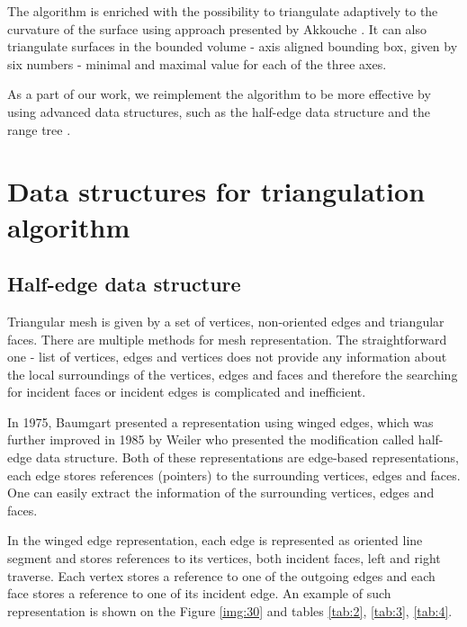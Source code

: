 The algorithm is enriched with the possibility to triangulate adaptively
to the curvature of the surface using approach presented by Akkouche 
\cite{akkouche2001adaptive}. It can also triangulate surfaces in the
bounded volume - axis aligned bounding box, given by six numbers - minimal
and maximal value for each of the three axes.

As a part of our work, we reimplement the algorithm to be more effective by
using advanced data structures, such as the half-edge data structure 
\cite{kettner1999using} and the range tree \cite{lueker1978data}. 
\section{Data structures for triangulation algorithm}
\label{sub2.5}

\subsection{Half-edge data structure}
Triangular mesh is given by a set of vertices, non-oriented edges and triangular faces.
There are multiple methods for mesh representation. The straightforward one -
list of vertices, edges and vertices does not provide any information about
the local surroundings of the vertices, edges and faces and therefore the searching
for incident faces or incident edges is complicated and inefficient.

In 1975, Baumgart \cite{baumgart1975polyhedron} presented a representation
using winged edges, which was further improved in 1985 by Weiler \cite{weiler1985edge}
who presented the modification called half-edge data structure.
Both of these representations are edge-based representations, each edge stores
references (pointers) to the surrounding vertices, edges and faces. One can easily extract the information of the
surrounding vertices, edges and faces.

In the winged edge representation, each edge is represented as oriented line segment 
and stores references to its vertices, both incident faces, left and right traverse. 
Each vertex stores a reference to one of the outgoing edges and each
face stores a reference to one of its incident edge. An example of such representation
is shown on the Figure \ref{img:30} and tables \ref{tab:2}, \ref{tab:3}, \ref{tab:4}.


